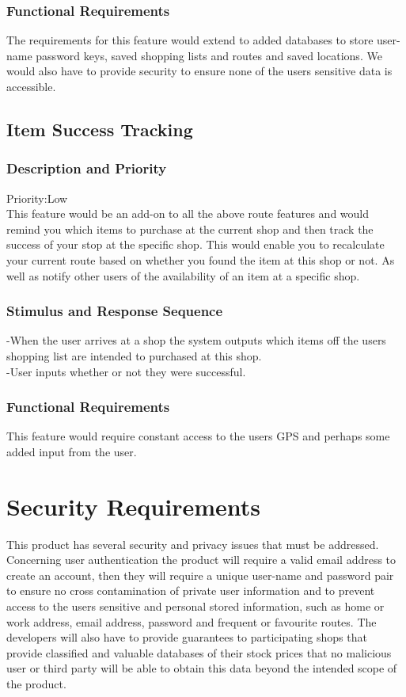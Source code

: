 \documentclass[12pt]{article}
\begin{document}
 \subsubsection{Functional Requirements}
The requirements for this feature would extend to added databases to store user-name password keys,  saved shopping lists and routes and saved locations. We would also have to provide security to ensure none of the users sensitive data is accessible. 

 \subsection{Item Success Tracking}
\subsubsection{Description and Priority}
 Priority:Low\\
 This feature would be an add-on to all the above route features and would remind you which items to purchase at the current shop and then track the success of your stop at the specific shop. This would enable you to recalculate your current route based on whether you found the item at this shop or not. As well as notify other users of the availability of an item at a specific shop.  
 \subsubsection{Stimulus and Response Sequence}
-When the user arrives at a shop the system outputs which items off  the users shopping list are intended to purchased at this shop.\\
-User  inputs whether or not they were successful.
 \subsubsection{Functional Requirements}
 This feature would require constant access to the users GPS and perhaps some added input from the user.
 
 \section{Security Requirements}
 This product has several security and privacy issues that must be addressed. Concerning user authentication the product will require a valid email address to create an account, then they will require a unique user-name and password pair to ensure no cross contamination of private user information and to prevent access to the users sensitive and personal stored information, such as home or work address, email address, password and frequent or favourite routes. The developers will also have to provide guarantees to participating shops that provide classified and valuable databases of their stock prices that no malicious user or third party will be able to obtain this data beyond the intended scope of the product.  
 
 
\end{document}
